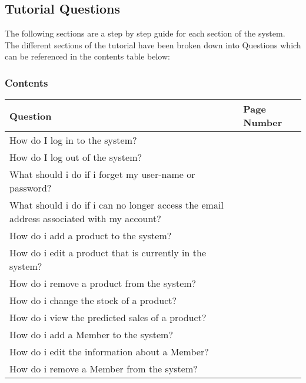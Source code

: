 \subsection{Tutorial Questions}
The following sections are a step by step guide for each section of the system. The different sections of the tutorial have been broken down into Questions which can be referenced in the contents table below:

\pagebreak
\subsubsection{Contents}

\begin{center}
    \begin{longtable}{|p{8cm}|p{3cm}|}
        \hline
	 \textbf{Question} & \textbf{Page Number} \\ \hline
	How do I log in to the system? & \pageref{fig:Logging into the system} \\ \hline
	How do I log out of the system? & \pageref{fig:Logging out of the system} \\ \hline
	What should i do if i forget my user-name or password?&  \pageref{fig:Forgetting Your User-name or Password} \\ \hline
	What should i do if i can no longer access the email address associated with my account? &  \pageref{fig:Unable to access your email address} \\ \hline
	How do i add a product to the system? &  \pageref{fig:Adding a Product to the system} \\ \hline
	How do i edit a product that is currently in the system?&  \pageref{fig:Editing a Product in the system} \\ \hline
	How do i remove a product from the system?&  \pageref{fig:Removing a Product from the system} \\ \hline
	How do i change the stock of a product?&  \pageref{fig:Changing the stock of a Product} \\ \hline
	How do i view the predicted sales of a product?&  \pageref{fig:Product Stock Prediction} \\ \hline
	How do i add a Member to the system?&  \pageref{fig:Adding a Member to the system} \\ \hline
	How do i edit the information about a Member?&  \pageref{fig:Editing a Member currently in the system} \\ \hline
	How do i remove a Member from the system?&  \pageref{fig:Removing a Member from the system} \\ \hline

\end{longtable}
\end{center}
